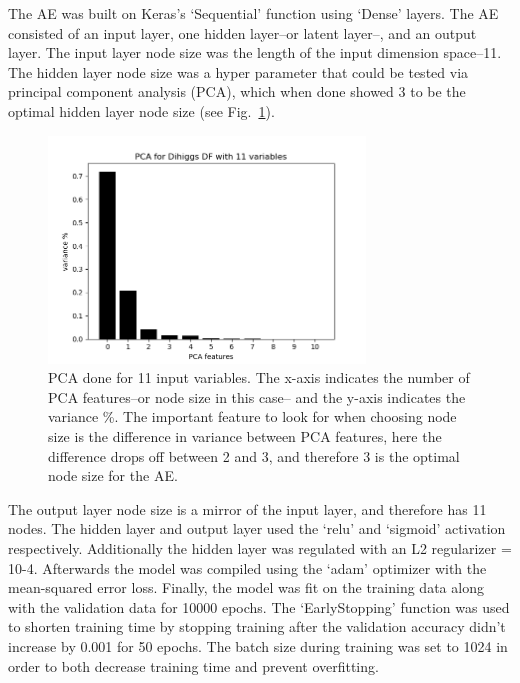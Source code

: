 The AE was built on Keras’s ‘Sequential’ function using ‘Dense’ layers. The AE consisted of an input layer, one hidden layer--or latent layer--, and an output layer. The input layer node size was the length of the input dimension space--11. The hidden layer node size was a hyper parameter that could be tested via principal component analysis (PCA), which when done showed 3 to be the optimal hidden layer node size (see Fig.~\ref{fig:ae_pca}).

\begin{figure}[!h] 
\begin{center}
\includegraphics*[width=0.75\textwidth] {AE/figures/ae_PCA_11vars}
\caption{PCA done for 11 input variables. The x-axis indicates the number of PCA features--or node size in this case-- and the y-axis indicates the variance \%. The important feature to look for when choosing node size is the difference in variance between PCA features, here the difference drops off between 2 and 3, and therefore 3 is the optimal node size for the AE.}
  \label{fig:ae_pca}
\end{center}
\end{figure}

The output layer node size is a mirror of the input layer, and therefore has 11 nodes. The hidden layer and output layer used the ‘relu’ and ‘sigmoid’ activation respectively. Additionally the hidden layer was regulated with an L2 regularizer = 10-4. Afterwards the model was compiled using the ‘adam’ optimizer with the mean-squared error loss. Finally, the model was fit on the training data along with the validation data for 10000 epochs. The ‘EarlyStopping’ function was used to shorten training time by stopping training after the validation accuracy didn’t increase by 0.001 for 50 epochs. The batch size during training was set to 1024 in order to both decrease training time and prevent overfitting.

